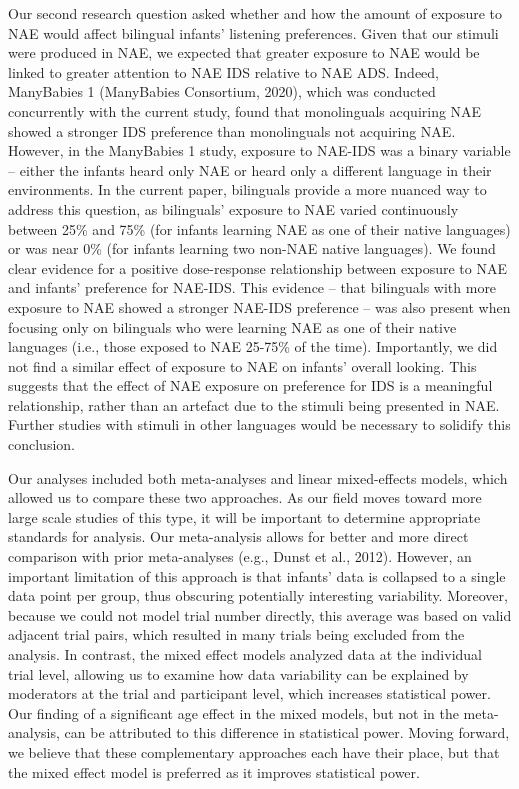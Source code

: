 \documentclass[
  english,
  ,man,floatsintext]{apa6}
\begin{document}
Our second research question asked whether and how the amount of exposure to NAE would affect bilingual infants' listening preferences. Given that our stimuli were produced in NAE, we expected that greater exposure to NAE would be linked to greater attention to NAE IDS relative to NAE ADS. Indeed, ManyBabies 1 (ManyBabies Consortium, 2020), which was conducted concurrently with the current study, found that monolinguals acquiring NAE showed a stronger IDS preference than monolinguals not acquiring NAE. However, in the ManyBabies 1 study, exposure to NAE-IDS was a binary variable -- either the infants heard only NAE or heard only a different language in their environments. In the current paper, bilinguals provide a more nuanced way to address this question, as bilinguals' exposure to NAE varied continuously between 25\% and 75\% (for infants learning NAE as one of their native languages) or was near 0\% (for infants learning two non-NAE native languages). We found clear evidence for a positive dose-response relationship between exposure to NAE and infants' preference for NAE-IDS. This evidence -- that bilinguals with more exposure to NAE showed a stronger NAE-IDS preference -- was also present when focusing only on bilinguals who were learning NAE as one of their native languages (i.e., those exposed to NAE 25-75\% of the time). Importantly, we did not find a similar effect of exposure to NAE on infants' overall looking. This suggests that the effect of NAE exposure on preference for IDS is a meaningful relationship, rather than an artefact due to the stimuli being presented in NAE. Further studies with stimuli in other languages would be necessary to solidify this conclusion.

Our analyses included both meta-analyses and linear mixed-effects models, which allowed us to compare these two approaches. As our field moves toward more large scale studies of this type, it will be important to determine appropriate standards for analysis. Our meta-analysis allows for better and more direct comparison with prior meta-analyses (e.g., Dunst et al., 2012). However, an important limitation of this approach is that infants' data is collapsed to a single data point per group, thus obscuring potentially interesting variability. Moreover, because we could not model trial number directly, this average was based on valid adjacent trial pairs, which resulted in many trials being excluded from the analysis. In contrast, the mixed effect models analyzed data at the individual trial level, allowing us to examine how data variability can be explained by moderators at the trial and participant level, which increases statistical power. Our finding of a significant age effect in the mixed models, but not in the meta-analysis, can be attributed to this difference in statistical power. Moving forward, we believe that these complementary approaches each have their place, but that the mixed effect model is preferred as it improves statistical power.
\end{document}
